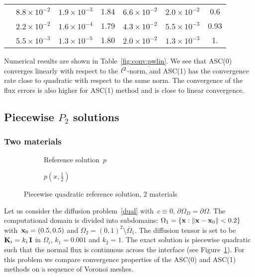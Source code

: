 \begin{table}[h!]
\begin{tabular}[1.5]{| c | c || c | c | c || c | c  ||}
		\cline{2-7}
		& $8.8\times10^{-2}$ & $1.9\times10^{-3}$ & 1.84 & $6.6\times10^{-2}$ & $ 2.0\times10^{-2}$ & 0.6 \\              %
		\cline{2-7}
		& $2.2\times10^{-2}$ & $1.6\times10^{-4}$ & 1.79 & $4.3\times10^{-2}$ & $ 5.5\times10^{-3}$ & 0.93 \\              %
		\cline{2-7}
		& $5.5\times10^{-3}$ & $1.3\times10^{-5}$ & 1.80 & $2.0\times10^{-2}$ & $ 1.3\times10^{-3}$ & 1.   \\  %
		\hline
	\end{tabular}
\end{table}

Numerical results are shown in Table~\ref{fig:conv:pwlin}. We see that ASC(0) converges linearly with respect to the ${\ell^2}$-norm,
and ASC(1) has the convergence rate close to quadratic with respect to the same norm.
The convergence of the flux errors is also higher for ASC(1) method and is close to linear convergence.

\subsection{Piecewise $P_2$ solutions}
	
\subsubsection{Two materials}\label{sec:twomat}

\begin{figure}[h]
	\begin{subfigure}{.45\linewidth}
		\centering
		\caption{Reference solution~$p$}
	\end{subfigure}%
	\hfill
	\begin{subfigure}{.45\linewidth}
		\centering
		\caption{$p(x,\frac{1}{2})$}
	\end{subfigure}
	\caption{Piecewise quadratic reference solution, 2 materials\label{fig:pwquad2}}
\end{figure}

Let us consider the diffusion problem~\eqref{dual} with~$c \equiv 0$, $\partial\Omega_D = \partial\Omega$. The computational domain is divided into subdomains: $\Omega_1 = \{ {\bf x} : \|{\bf x} - {\bf x}_0\|< 0.2\}$ with~${\bf x}_0 = (0.5,0.5)$ and $\Omega_2 = (0,1)^2 \setminus \bar{\Omega}_1$. The diffusion tensor is set to be $\boldsymbol{\mathbf{K}}_i = k_i\,\boldsymbol{\mathbf{I}}$ in $\Omega_i$, $k_1 = 0.001$ and $k_2=1$. The exact solution is piecewise quadratic such that the normal flux is continuous across the interface (see Figure~\ref{fig:pwquad2}). For this problem we compare convergence properties of the  ASC(0) and ASC(1) methods on a sequence of Voronoi meshes.

